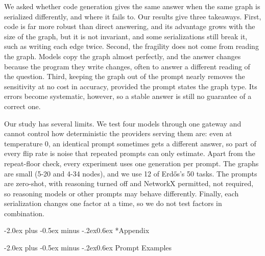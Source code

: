 \documentclass[11pt]{article}
\makeatletter
\renewcommand\section{\@startsection{section}{1}{\z@}
  {-2.0ex plus -0.5ex minus -.2ex}{0.6ex}
  {\large\bfseries\centering}}
\makeatother
\begin{document}
We asked whether code generation gives the same answer when the same graph is serialized differently, and where it fails to. Our results give three takeaways. First, code is far more robust than direct answering, and its advantage grows with the size of the graph, but it is not invariant, and some serializations still break it, such as writing each edge twice. Second, the fragility does not come from reading the graph. Models copy the graph almost perfectly, and the answer changes because the program they write changes, often to answer a different reading of the question. Third, keeping the graph out of the prompt nearly removes the sensitivity at no cost in accuracy, provided the prompt states the graph type. Its errors become systematic, however, so a stable answer is still no guarantee of a correct one.

Our study has several limits. We test four models through one gateway and cannot control how deterministic the providers serving them are: even at temperature 0, an identical prompt sometimes gets a different answer, so part of every flip rate is noise that repeated prompts can only estimate. Apart from the repeat-floor check, every experiment uses one generation per prompt. The graphs are small (5-20 and 4-34 nodes), and we use 12 of Erdős's 50 tasks. The prompts are zero-shot, with reasoning turned off and NetworkX permitted, not required, so reasoning models or other prompts may behave differently. Finally, each serialization changes one factor at a time, so we do not test factors in combination.



\onecolumn
\appendix
\section*{Appendix}
\renewcommand{\thefigure}{\thesection\arabic{figure}}
\renewcommand{\thetable}{\thesection\arabic{table}}

\FloatBarrier
\section{Prompt Examples}\label{app:prompts}
\end{document}
